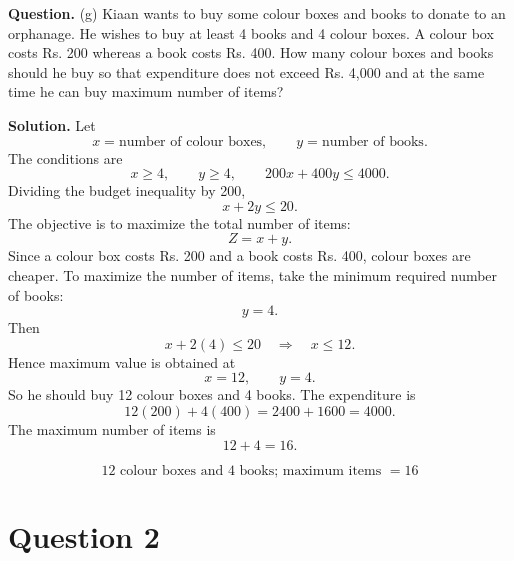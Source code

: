 \documentclass[11pt,a4paper]{article}
\newcommand{\question}[1]{\begin{questionbox}\textbf{Question.} #1\end{questionbox}}
\newcommand{\answer}{\begin{answerbox}\textbf{Solution.} }
\newcommand{\eanswer}{\end{answerbox}}
\newcommand{\finalans}[1]{\[\boxed{#1}\]}
\begin{document}
\question{(g) Kiaan wants to buy some colour boxes and books to donate to an orphanage. He wishes to buy at least 4 books and 4 colour boxes. A colour box costs Rs. 200 whereas a book costs Rs. 400. How many colour boxes and books should he buy so that expenditure does not exceed Rs. 4,000 and at the same time he can buy maximum number of items?}
\answer
Let
\[
x=\text{number of colour boxes},\qquad y=\text{number of books}.
\]
The conditions are
\[
x\ge 4,
\qquad y\ge 4,
\qquad 200x+400y\le 4000.
\]
Dividing the budget inequality by 200,
\[
x+2y\le 20.
\]
The objective is to maximize the total number of items:
\[
Z=x+y.
\]
Since a colour box costs Rs. 200 and a book costs Rs. 400, colour boxes are cheaper. To maximize the number of items, take the minimum required number of books:
\[
y=4.
\]
Then
\[
x+2(4)\le 20\quad\Rightarrow\quad x\le 12.
\]
Hence maximum value is obtained at
\[
x=12,
\qquad y=4.
\]
So he should buy 12 colour boxes and 4 books. The expenditure is
\[
12(200)+4(400)=2400+1600=4000.
\]
The maximum number of items is
\[
12+4=16.
\]
\begin{center}
\end{center}
\finalans{12\text{ colour boxes and }4\text{ books; maximum items }=16}
\eanswer

\section*{Question 2}
\end{document}
